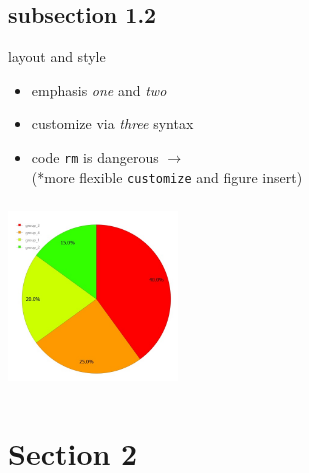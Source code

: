 \documentclass[11pt]{beamer}
\newcommand{\code}[1]{\texttt{#1}}
\begin{document}
\subsection{subsection 1.2}
\begin{frame}{layout and style}
    \begin{minipage}[t]{0.5\textwidth}
        \vspace{0pt}
        \begin{itemize}
            \item emphasis \emph{one} and \emph{two}
            \item customize  via \emph{\color{red}three} syntax
            \item code \code{rm} is dangerous $\rightarrow$ \\ {\footnotesize\color{olive}(*more flexible \code{customize} and figure insert)}
        \end{itemize}
    \end{minipage}%
    \hfill
    \begin{minipage}[t]{0.45\textwidth}
        \vspace{0pt}
        \centering
              \includegraphics[height=5cm, width=4.5cm]{fig1.jpg}
    \end{minipage}
\end{frame}

\section{Section 2}
\end{document}
